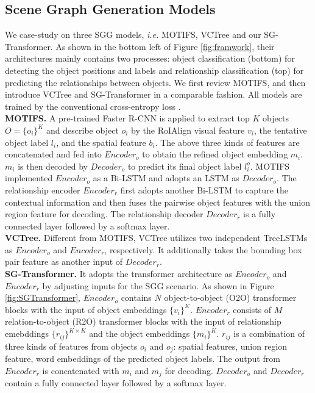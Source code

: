 \documentclass{article}
\begin{document}
\subsection{Scene Graph Generation Models}
\label{ssec:biasedModel}

We case-study on 
three SGG models, \textit{i.e.} MOTIFS, VCTree and our SG-Transformer. As shown in the bottom left of Figure \ref{fig:framwork}, their architectures  mainly contains two processes: object classification (bottom)  for detecting the object positions and labels and relationship classification (top) for predicting the relationships between objects. We first review  MOTIFS, and then introduce VCTree and SG-Transformer in a comparable fashion. All models are trained by the conventional cross-entropy loss \cite{zellers2018neural}.
\\
\textbf{MOTIFS.} A pre-trained Faster R-CNN \cite{ren2015faster} is applied to extract top $K$ objects $O=\{o_i\}^K$ and describe object $o_i$ by the RoIAlign visual feature $v_i$,  the tentative object label $l_i$, and the spatial feature $b_i$. The above three kinds of features are concatenated and fed into $Encoder_o$ to obtain the refined object embedding $m_i$. $m_i$ is then decoded by  $Decoder_o$ to predict its final object label $l_i^o$. MOTIFS implemented $Encoder_o$ as a Bi-LSTM and adopts an LSTM as $Decoder_o$. The relationship encoder $Encoder_r$ first adopts another Bi-LSTM to capture the contextual information and then fuses the pairwise object features with the union region feature for decoding. The relationship decoder $Decoder_r$ is a fully connected layer followed by a softmax layer. 
\\
\textbf{VCTree.} Different from MOTIFS, VCTree utilizes two independent TreeLSTMs as $Encoder_o$ and $Encoder_r$, respectively. It additionally takes the bounding box pair feature as another input of $Decoder_r$.
\\
\textbf{SG-Transformer.} It adopts the  transformer architecture as $Encoder_o$ and  $Encoder_r$ by adjusting inputs for the SGG scenario. As shown in Figure \ref{fig:SGTransformer}, $Encoder_o$ contains $N$ object-to-object (O2O) transformer blocks with the input of object embeddings $\{v_i\}^K$. $Encoder_r$ consists of $M$ relation-to-object (R2O) transformer blocks with the input of relationship emebddings $\{r_{ij}\}^{K\times K}$  and the object embeddings $\{m_i\}^K$. $r_{ij}$ is a combination of  three kinds of features from objects $o_i$ and $o_j$: spatial features, union region feature, word embeddings \cite{pennington2014glove} 
of the predicted object labels. The output from $Encoder_r$ is concatenated with $m_i$ and $m_j$ for decoding. $Decoder_o$ and $Decoder_r$ contain a fully connected layer followed by a softmax layer. 
\end{document}
